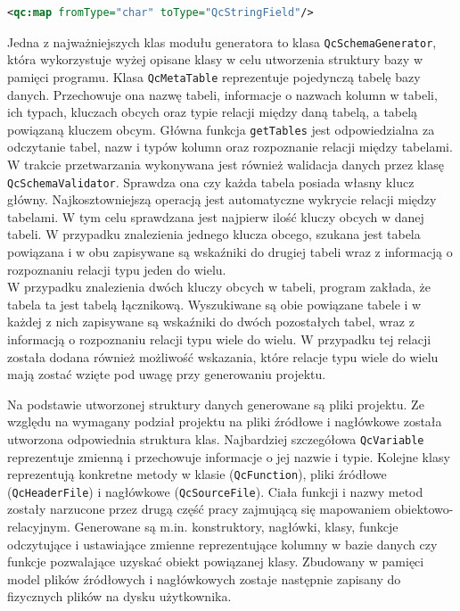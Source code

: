 \documentclass[12pt]{report}
\let\oldaddcontentsline\addcontentsline
\newcommand{\lstinputcplusplus}[2][]{{%
  \renewcommand{\lstlistingname}{C++ Code}%
  \renewcommand{\addcontentsline}[3]{\oldaddcontentsline{loc}{##2}{##3}}%
}}
\begin{document}
\begin{framed}
\begin{lstlisting}[language=XML]
<qc:map fromType="char" toType="QcStringField"/>
\end{lstlisting}
\end{framed}

Jedna z najważniejszych klas modułu generatora to klasa {\tt QcSchemaGenerator}, która  wykorzystuje wyżej opisane klasy w celu utworzenia struktury bazy w pamięci programu. {\color{black} Klasa {\tt QcMetaTable} reprezentuje pojedynczą tabelę bazy danych. Przechowuje ona nazwę tabeli, informacje o nazwach kolumn w tabeli, ich typach, kluczach obcych oraz typie relacji między daną tabelą, a tabelą powiązaną kluczem obcym. Główna funkcja {\tt getTables} jest odpowiedzialna za odczytanie tabel, nazw i typów kolumn oraz rozpoznanie relacji między tabelami. W trakcie przetwarzania wykonywana jest również walidacja danych przez klasę {\tt QcSchemaValidator}. Sprawdza ona czy każda tabela posiada własny klucz główny. Najkosztowniejszą operacją jest automatyczne wykrycie relacji między tabelami. W tym celu sprawdzana jest najpierw ilość kluczy obcych w danej tabeli. W przypadku znalezienia jednego klucza obcego, szukana jest tabela powiązana i w obu zapisywane są wskaźniki do drugiej tabeli wraz z informacją o rozpoznaniu relacji typu jeden do wielu.\\
\indent W przypadku znalezienia dwóch kluczy obcych w tabeli, program zakłada, że tabela ta jest tabelą łącznikową. Wyszukiwane są obie powiązane tabele i w każdej z nich zapisywane są wskaźniki do dwóch pozostałych tabel, wraz z informacją o rozpoznaniu relacji typu wiele do wielu. W przypadku tej relacji została dodana również możliwość wskazania, które relacje typu wiele do wielu mają zostać wzięte pod uwagę przy generowaniu projektu.}

\begin{framed}
\lstinputcplusplus[caption={QcSchemaGenerator}]{additional/qcschemagenerator.cpp}
\end{framed}

Na podstawie utworzonej struktury danych generowane są pliki projektu. Ze względu na wymagany podział projektu na pliki źródłowe i nagłówkowe została utworzona odpowiednia struktura klas. Najbardziej szczegółowa {\tt QcVariable} reprezentuje zmienną i przechowuje informacje o jej nazwie i typie. Kolejne klasy reprezentują konkretne metody w klasie ({\tt QcFunction}), pliki źródłowe ({\tt QcHeader\-File}) i nagłówkowe ({\tt QcSourceFile}). Ciała funkcji i nazwy metod zostały narzucone przez drugą część pracy zajmującą się mapowaniem obiektowo-relacyjnym. Generowane są m.in. konstruktory, nagłówki, klasy, funkcje odczytujące i ustawiają\-ce zmienne reprezentujące kolumny w bazie danych czy funkcje pozwalające uzyskać obiekt powiązanej klasy. {\color{black} Zbudowany w pamięci model plików źródłowych i nagłówkowych zostaje następnie zapisany do fizycznych plików na dysku użytkownika.}
\end{document}
